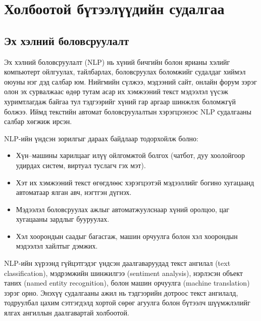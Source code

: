 ﻿%
%
\chapter{Холбоотой бүтээлүүдийн судалгаа}
\label{Chapter2}


\section{Эх хэлний боловсруулалт}

Эх хэлний боловсруулалт (NLP) нь хүний бичгийн болон ярианы хэлийг
компьютерт ойлгуулах, тайлбарлах, боловсруулах боломжийг судалдаг хиймэл
оюуны нэг дэд салбар юм. Нийгмийн сүлжээ, мэдээний сайт, онлайн форум зэрэг
олон эх сурвалжаас өдөр тутам асар их хэмжээний текст мэдээлэл үүсэж
хуримтлагдаж байгаа тул тэдгээрийг хүний гар аргаар шинжлэх боломжгүй болжээ.
Иймд текстийн автомат боловсруулалтын хэрэгцээнээс NLP судалгааны салбар
хөгжиж ирсэн.

NLP-ийн үндсэн зорилгыг дараах байдлаар тодорхойлж болно:

\begin{itemize}
  \item Хүн--машины харилцааг илүү ойлгомжтой болгох
        (чатбот, дуу хоолойгоор удирдах систем, виртуал туслагч гэх мэт).
  \item Хэт их хэмжээний текст өгөгдлөөс хэрэгцээтэй мэдээллийг богино
        хугацаанд автоматаар ялган авч, нэгтгэн дүгнэх.
  \item Мэдээлэл боловсруулах ажлыг автоматжуулснаар хүний оролцоо,
        цаг хугацааны зардлыг бууруулах.
  \item Хэл хоорондын саадыг багасгаж, машин орчуулга болон
        хэл хоорондын мэдээлэл хайлтыг дэмжих.
\end{itemize}

NLP-ийн хүрээнд гүйцэтгэдэг үндсэн даалгаваруудад текст ангилал
(text classification), мэдрэмжийн шинжилгээ (sentiment analysis), нэрлэсэн
объект таних (named entity recognition), болон машин орчуулга
(machine translation) зэрэг орно. Энэхүү судалгааны ажил нь тэдгээрийн
дотроос текст ангилалд, тодруулбал цахим сэтгэгдэлд хортой сөрөг агуулга
болон бүтээлч шүүмжлэлийг ялгах ангиллын даалгавартай холбоотой.

